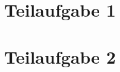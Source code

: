 \section{Teilaufgabe 1}%
\begin{aufgabe}%
\begin{teile}
	\item
	\item
	\item
	\item
	\item
\end{teile}		
\end{aufgabe}


\begin{aufgabe}%
\begin{teile}
\item
\item
\item
\item 
\end{teile}	
\end{aufgabe}


\begin{aufgabe}%
\begin{teile}
	\item
	\item
	\item
	\item 
\end{teile}		
\end{aufgabe}

\section{Teilaufgabe 2}%
\setcounter{aufgcount}{0}

\begin{aufgabe}%
	
\end{aufgabe}


\begin{aufgabe}%
	
\end{aufgabe}


\begin{aufgabe}%
\begin{teile}
	\item
	\item
	\item 
\end{teile}	
\end{aufgabe}


